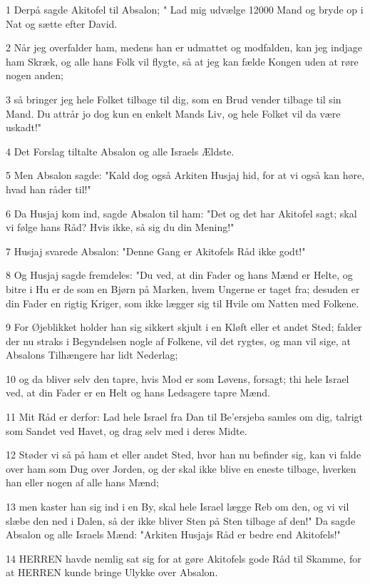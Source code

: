 \par 1 Derpå sagde Akitofel til Absalon; " Lad mig udvælge 12000 Mand og bryde op i Nat og sætte efter David.
\par 2 Når jeg overfalder ham, medens han er udmattet og modfalden, kan jeg indjage ham Skræk, og alle hans Folk vil flygte, så at jeg kan fælde Kongen uden at røre nogen anden;
\par 3 så bringer jeg hele Folket tilbage til dig, som en Brud vender tilbage til sin Mand. Du attrår jo dog kun en enkelt Mands Liv, og hele Folket vil da være uskadt!"
\par 4 Det Forslag tiltalte Absalon og alle Israels Ældste.
\par 5 Men Absalon sagde: "Kald dog også Arkiten Husjaj hid, for at vi også kan høre, hvad han råder til!"
\par 6 Da Husjaj kom ind, sagde Absalon til ham: "Det og det har Akitofel sagt; skal vi følge hans Råd? Hvis ikke, så sig du din Mening!"
\par 7 Husjaj svarede Absalon: "Denne Gang er Akitofels Råd ikke godt!"
\par 8 Og Husjaj sagde fremdeles: "Du ved, at din Fader og hans Mænd er Helte, og bitre i Hu er de som en Bjørn på Marken, hvem Ungerne er taget fra; desuden er din Fader en rigtig Kriger, som ikke lægger sig til Hvile om Natten med Folkene.
\par 9 For Øjeblikket holder han sig sikkert skjult i en Kløft eller et andet Sted; falder der nu straks i Begyndelsen nogle af Folkene, vil det rygtes, og man vil sige, at Absalons Tilhængere har lidt Nederlag;
\par 10 og da bliver selv den tapre, hvis Mod er som Løvens, forsagt; thi hele Israel ved, at din Fader er en Helt og hans Ledsagere tapre Mænd.
\par 11 Mit Råd er derfor: Lad hele Israel fra Dan til Be'ersjeba samles om dig, talrigt som Sandet ved Havet, og drag selv med i deres Midte.
\par 12 Støder vi så på ham et eller andet Sted, hvor han nu befinder sig, kan vi falde over ham som Dug over Jorden, og der skal ikke blive en eneste tilbage, hverken han eller nogen af alle hans Mænd;
\par 13 men kaster han sig ind i en By, skal hele Israel lægge Reb om den, og vi vil slæbe den ned i Dalen, så der ikke bliver Sten på Sten tilbage af den!" Da sagde Absalon og alle Israels Mænd: "Arkiten Husjajs Råd er bedre end Akitofels!"
\par 14 HERREN havde nemlig sat sig for at gøre Akitofels gode Råd til Skamme, for at HERREN kunde bringe Ulykke over Absalon.
